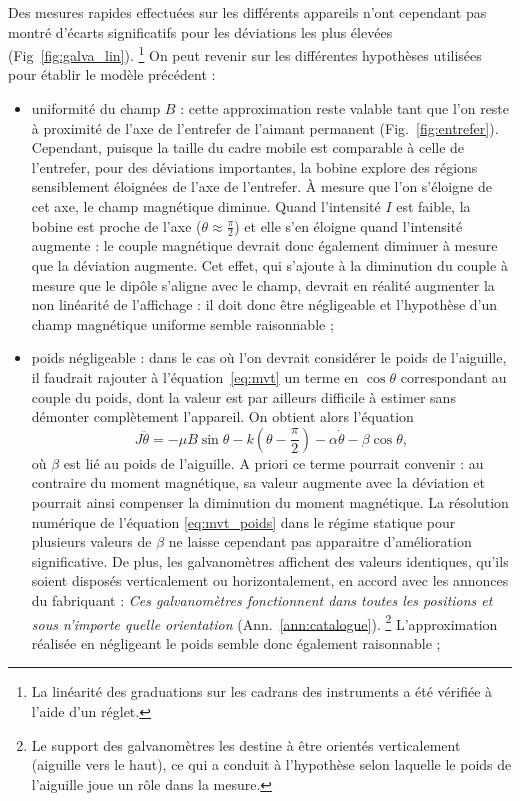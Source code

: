 \documentclass[12pt,a4paper,fleqn]{article}
\begin{document}
Des mesures rapides effectuées sur les différents appareils n'ont cependant pas montré d'écarts significatifs pour les déviations les plus élevées (Fig~\ref{fig:galva_lin}).
\footnote{La linéarité des graduations sur les cadrans des instruments a été vérifiée à l'aide d'un réglet.}
On peut revenir sur les différentes hypothèses utilisées pour établir le modèle précédent :
\begin{itemize}
\item uniformité du champ $B$ : cette approximation reste valable tant que l'on reste à proximité de l'axe de l'entrefer de l'aimant permanent (Fig.~\ref{fig:entrefer}).
Cependant, puisque la taille du cadre mobile est comparable à celle de l'entrefer, pour des déviations importantes, la bobine explore des régions sensiblement éloignées de l'axe de l'entrefer.
À mesure que l'on s'éloigne de cet axe, le champ magnétique diminue.
Quand l'intensité $I$ est faible, la bobine est proche de l'axe ($\theta\approx\tfrac{\pi}{2}$) et elle s'en éloigne quand l'intensité augmente : le couple magnétique devrait donc également diminuer à mesure que la déviation augmente.
Cet effet, qui s'ajoute à la diminution du couple à mesure que le dipôle s'aligne avec le champ, devrait en réalité augmenter la non linéarité de l'affichage : il doit donc être négligeable et l'hypothèse d'un champ magnétique uniforme semble raisonnable ;

\item poids négligeable : dans le cas où l'on devrait considérer le poids de l'aiguille, il faudrait rajouter à l'équation~\ref{eq:mvt} un terme en $\cos\theta$ correspondant au couple du poids, dont la valeur est par ailleurs difficile à estimer sans démonter complètement l'appareil.
On obtient alors l'équation 
\begin{equation}
J\ddot{\theta} = -\mu B \sin \theta - k\left(\theta-\frac{\pi}{2}\right) - \alpha\dot{\theta} - \beta \cos\theta,
\label{eq:mvt_poids}
\end{equation}
où $\beta$ est lié au poids de l'aiguille.
A priori ce terme pourrait convenir : au contraire du moment magnétique, sa valeur augmente avec la déviation et pourrait ainsi compenser la diminution du moment magnétique.
La résolution numérique de l'équation \ref{eq:mvt_poids} dans le régime statique pour plusieurs valeurs de $\beta$ ne laisse cependant pas apparaitre d'amélioration significative.
De plus, les galvanomètres affichent des valeurs identiques, qu'ils soient disposés verticalement ou horizontalement, en accord avec les annonces du fabriquant : \og \emph{Ces galvanomètres fonctionnent dans toutes les positions et sous n'importe quelle orientation} \fg{} (Ann.~\ref{ann:catalogue}). 
\footnote{Le support des galvanomètres les destine à être orientés verticalement (aiguille vers le haut), ce qui a conduit à l'hypothèse selon laquelle le poids de l'aiguille joue un rôle dans la mesure.}
L'approximation réalisée en négligeant le poids semble donc également raisonnable ;


\end{itemize}
\end{document}
